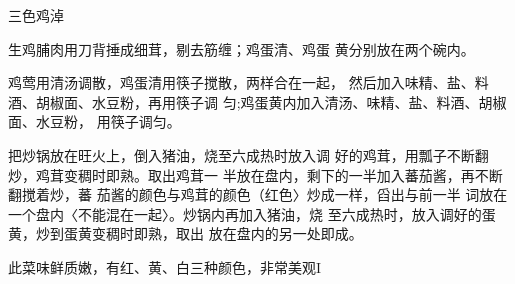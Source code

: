\begin{recipe}{三色鸡淖}

\ingredients


\cooking

\step 	生鸡脯肉用刀背捶成细茸，剔去筋缠；鸡蛋清、鸡蛋 黄分别放在两个碗内。

\step 	鸡莺用清汤调散，鸡蛋清用筷子搅散，两样合在一起， 然后加入味精、盐、料酒、胡椒面、水豆粉，再用筷子调 匀;鸡蛋黄内加入清汤、味精、盐、料酒、胡椒面、水豆粉， 用筷子调匀。

\step 	把炒锅放在旺火上，倒入猪油，烧至六成热时放入调 好的鸡茸，用瓢子不断翻炒，鸡茸变稠时即熟。取出鸡茸一 半放在盘内，剩下的一半加入蕃茄酱，再不断翻搅着炒，蕃 茄酱的颜色与鸡茸的颜色（红色〉炒成一样，舀出与前一半 词放在一个盘内〈不能混在一起〉。炒锅内再加入猪油，烧 至六成热时，放入调好的蛋黄，炒到蛋黄变稠时即熟，取出 放在盘内的另一处即成。

\notes

此菜味鲜质嫩，有红、黄、白三种颜色，非常美观I

\end{recipe}

